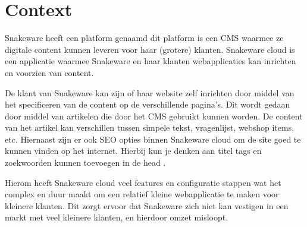 \section{Context}
Snakeware heeft een platform genaamd  dit platform is een \gls{CMS} waarmee ze digitale content kunnen leveren voor haar (grotere) klanten.
Snakeware cloud is een applicatie waarmee Snakeware en haar klanten webapplicaties kan inrichten en voorzien van content.

\whitespace[2]
De klant van Snakeware kan zijn of haar website zelf inrichten door middel van het specificeren van de content op de verschillende pagina’s.
Dit wordt gedaan door middel van artikelen die door het \gls{CMS} gebruikt kunnen worden.
De content van het artikel kan verschillen tussen simpele tekst, vragenlijst, webshop items, etc.
Hiernaast zijn er ook \gls{SEO} opties binnen Snakeware cloud om de site goed te kunnen vinden op het internet.
Hierbij kun je denken aan titel tags en zoekwoorden kunnen toevoegen in de head \Parencite{HTMLhead}.

\whitespace[2]
Hierom heeft Snakeware cloud veel features en configuratie stappen wat het complex en duur maakt om een relatief kleine webapplicatie te maken voor kleinere klanten.
Dit zorgt ervoor dat Snakeware zich niet kan vestigen in een markt met veel kleinere klanten, en hierdoor omzet misloopt.

